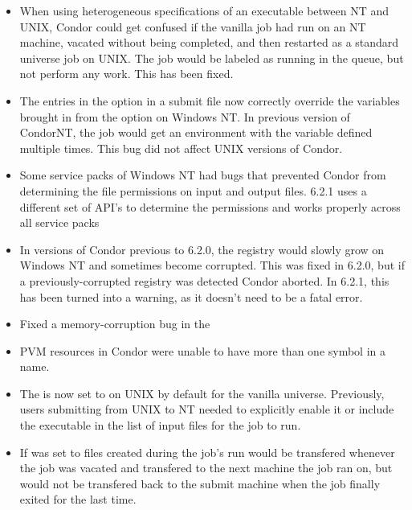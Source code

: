 \begin{itemize}

\item When using heterogeneous specifications of an executable between
NT and UNIX, Condor could get confused if the vanilla job had run on
an NT machine, vacated without being completed, and then restarted as
a standard universe job on UNIX. The job would be labeled as running in
the queue, but not perform any work. This has been fixed.

\item The entries in the  
option in a submit file now correctly override the variables brought in
from the  option on Windows NT.
In previous version of CondorNT, the job would get an environment with the
variable defined multiple times. This bug did not affect UNIX versions of 
Condor.

\item Some service packs of Windows NT had bugs that prevented Condor
from determining the file permissions on input and output files. 6.2.1
uses a different set of API's to determine the permissions and works 
properly across all service packs

\item In versions of Condor previous to 6.2.0, the registry would slowly
grow on Windows NT and sometimes become corrupted. This was fixed in 6.2.0,
but if a previously-corrupted registry was detected Condor aborted. In 6.2.1,
this has been turned into a warning, as it doesn't need to be a fatal error.

\item Fixed a memory-corruption bug in the 

\item PVM resources in Condor were unable to have more than one
 symbol in a name. 

\item The  is now set to 
on UNIX by default for the vanilla universe. Previously, users submitting
from UNIX to NT needed to explicitly enable it or include the executable in
the list of input files for the job to run.

\item If  was set to 
files created during the job's run would be transfered whenever the job was 
vacated and transfered to the next machine the job ran on, but would not be
transfered back to the submit machine when the job finally exited for the last time.


\end{itemize}
